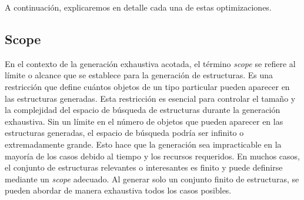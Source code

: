 

A continuación, explicaremos en detalle cada una de estas optimizaciones.

\subsection{Scope}
\label{sec:scope}



En el contexto de la generación exhaustiva acotada, el término \emph{scope} se refiere al límite o alcance que se establece para la generación de estructuras. 
Es una restricción que define cuántos objetos de un tipo particular pueden aparecer en las estructuras generadas. 
Esta restricción es esencial para controlar el tamaño y la complejidad del espacio de búsqueda de estructuras durante 
la generación exhaustiva. Sin un límite en el número de objetos que pueden aparecer en las estructuras generadas,
 el espacio de búsqueda podría ser infinito o extremadamente grande. Esto hace que la generación sea impracticable en la mayoría de los casos debido al tiempo 
 y los recursos requeridos.  En muchos casos, el conjunto de estructuras relevantes o interesantes es finito y puede definirse mediante un \emph{scope} adecuado.
 Al generar solo un conjunto finito de estructuras, se pueden abordar de manera exhaustiva todos los casos posibles.

